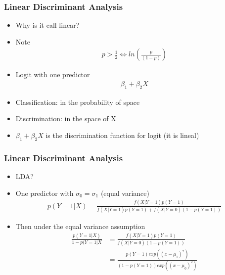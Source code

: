 \documentclass[
  shownotes,
  xcolor={svgnames},
  hyperref={colorlinks,citecolor=DarkBlue,linkcolor=DarkRed,urlcolor=DarkBlue}
  , aspectratio=169]{beamer}
\begin{document}
\begin{frame}[fragile]
\frametitle{Linear Discriminant Analysis}

\begin{itemize}
  \item Why is it call linear?
  \item Note
  \begin{align}
    p>\frac{1}{2} \iff ln(\frac{p}{(1-p)})
  \end{align}
  \item Logit with one predictor
  \begin{align}
  \beta_1 + \beta_2 X
  \end{align}
  \item Classification: in the probability of space
  \item Discrimination: in the space of X
  \item $\beta_1 +\beta_2 X$ is the discrimination function for logit (it is lineal)
\end{itemize}

\end{frame}
\begin{frame}[fragile]
\frametitle{Linear Discriminant Analysis}
\begin{itemize}
  \item LDA?
  \item One predictor with $\sigma_0 = \sigma_1$ (equal variance)
  \begin{align}
  p (Y=1|X)=\frac{f(X|Y=1)p(Y=1)}{f(X|Y=1)p(Y=1) + f(X|Y=0)(1-p(Y=1))}
  \end{align}
  \item Then under the equal variance assumption
  \begin{align}
  \frac{p (Y=1|X)}{1-p (Y=1|X} &= \frac{f(X|Y=1)p(Y=1)}{f(X|Y=0)(1-p(Y=1))} \\
                                &= \frac{p(Y=1)exp((x-\mu_1)^2)}{(1-p(Y=1))exp((x-\mu_0)^2)} 
  \end{align}
\end{itemize}

\end{frame}
\end{document}
